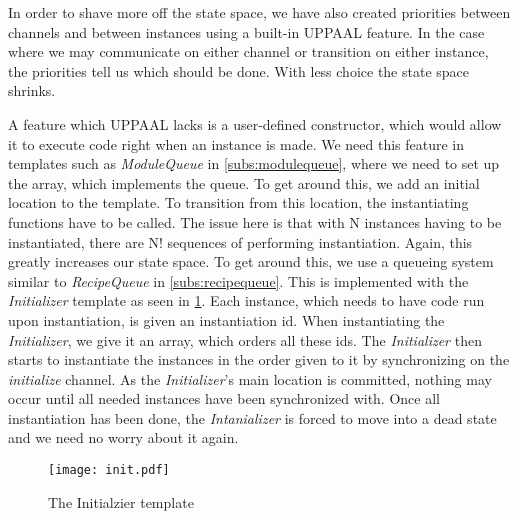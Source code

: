 In order to shave more off the state space, we have also created priorities between channels and between instances using a built-in UPPAAL feature. In the case where we may communicate on either channel or transition on either instance, the priorities tell us which should be done. With less choice the state space shrinks.

A feature which UPPAAL lacks is a user-defined constructor, which would allow it to execute code right when an instance is made. We need this feature in templates such as \emph{ModuleQueue} in \cref{subs:modulequeue}, where we need to set up the array, which implements the queue. To get around this, we add an initial location to the template. To transition from this location, the instantiating functions have to be called. The issue here is that with N instances having to be instantiated, there are N! sequences of performing instantiation. Again, this greatly increases our state space. To get around this, we use a queueing system similar to \emph{RecipeQueue} in \cref{subs:recipequeue}. This is implemented with the \emph{Initializer} template as seen in \cref{fig:initializer}. Each instance, which needs to have code run upon instantiation, is given an instantiation id. When instantiating the \emph{Initializer}, we give it an array, which orders all these ids. The \emph{Initializer} then starts to instantiate the instances in the order given to it by synchronizing on the \emph{initialize} channel. As the \emph{Initializer}'s main location is committed, nothing may occur until all needed instances have been synchronized with. Once all instantiation has been done, the \emph{Intanializer} is forced to move into a dead state and we need no worry about it again.    

\begin{figure}[h]
\centering
\texttt{[image: init.pdf]}
\caption{The Initialzier template}
\label{fig:initializer}
\end{figure}


